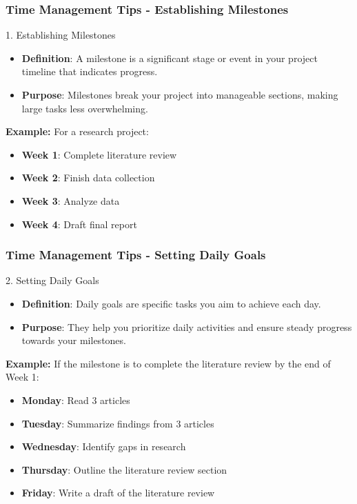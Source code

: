 \documentclass[aspectratio=169]{beamer}
\begin{document}
\begin{frame}[fragile]
    \frametitle{Time Management Tips - Establishing Milestones}
    \begin{block}{1. Establishing Milestones}
        \begin{itemize}
            \item \textbf{Definition}: A milestone is a significant stage or event in your project timeline that indicates progress.
            \item \textbf{Purpose}: Milestones break your project into manageable sections, making large tasks less overwhelming.
        \end{itemize}
        \textbf{Example:} For a research project:
        \begin{itemize}
            \item \textbf{Week 1}: Complete literature review
            \item \textbf{Week 2}: Finish data collection
            \item \textbf{Week 3}: Analyze data
            \item \textbf{Week 4}: Draft final report
        \end{itemize}
    \end{block}
\end{frame}

\begin{frame}[fragile]
    \frametitle{Time Management Tips - Setting Daily Goals}
    \begin{block}{2. Setting Daily Goals}
        \begin{itemize}
            \item \textbf{Definition}: Daily goals are specific tasks you aim to achieve each day.
            \item \textbf{Purpose}: They help you prioritize daily activities and ensure steady progress towards your milestones.
        \end{itemize}
        \textbf{Example:} If the milestone is to complete the literature review by the end of Week 1:
        \begin{itemize}
            \item \textbf{Monday}: Read 3 articles
            \item \textbf{Tuesday}: Summarize findings from 3 articles
            \item \textbf{Wednesday}: Identify gaps in research
            \item \textbf{Thursday}: Outline the literature review section
            \item \textbf{Friday}: Write a draft of the literature review
        \end{itemize}
    \end{block}
\end{frame}
\end{document}
